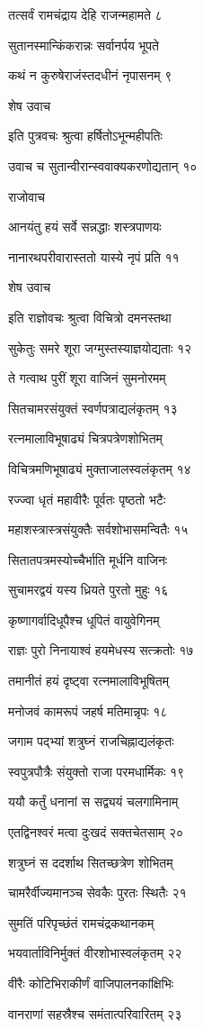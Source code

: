 तत्सर्वं रामचंद्राय देहि राजन्महामते ८

सुतानस्मान्किंकरान्नः सर्वानर्पय भूपते

कथं न कुरुषेराजंस्तदधीनं नृपासनम् ९

शेष उवाच

इति पुत्रवचः श्रुत्वा हर्षितोऽभून्महीपतिः

उवाच च सुतान्वीरान्स्ववाक्यकरणोद्यतान् १०

राजोवाच

आनयंतु हयं सर्वे सन्नद्धाः शस्त्रपाणयः

नानारथपरीवारास्ततो यास्ये नृपं प्रति ११

शेष उवाच

इति राज्ञोवचः श्रुत्वा विचित्रो दमनस्तथा

सुकेतुः समरे शूरा जग्मुस्तस्याज्ञयोद्यताः १२

ते गत्वाथ पुरीं शूरा वाजिनं सुमनोरमम्

सितचामरसंयुक्तं स्वर्णपत्राद्यलंकृतम् १३

रत्नमालाविभूषाढ्यं चित्रपत्रेणशोभितम्

विचित्रमणिभूषाढ्यं मुक्ताजालस्वलंकृतम् १४

रज्ज्वा धृतं महावीरैः पूर्वतः पृष्ठतो भटैः

महाशस्त्रास्त्रसंयुक्तैः सर्वशोभासमन्वितैः १५

सितातपत्रमस्योच्चैर्भाति मूर्धनि वाजिनः

सुचामरद्वयं यस्य ध्रियते पुरतो मुहुः १६

कृष्णागर्वादिधूपैश्च धूपितं वायुवेगिनम्

राज्ञः पुरो निनायाश्वं हयमेधस्य सत्क्रतोः १७

तमानीतं हयं दृष्ट्वा रत्नमालाविभूषितम्

मनोजवं कामरूपं जहर्ष मतिमान्नृपः १८

जगाम पद्भ्यां शत्रुघ्नं राजचिह्नाद्यलंकृतः

स्वपुत्रपौत्रैः संयुक्तो राजा परमधार्मिकः १९

ययौ कर्तुं धनानां स सद्व्ययं चलगामिनाम्

एतद्विनश्वरं मत्वा दुःखदं सक्तचेतसाम् २०

शत्रुघ्नं स ददर्शाथ सितच्छत्रेण शोभितम्

चामरैर्वीज्यमानञ्च सेवकैः पुरतः स्थितैः २१

सुमतिं परिपृच्छंतं रामचंद्रकथानकम्

भयवार्ताविनिर्मुक्तं वीरशोभास्वलंकृतम् २२

वीरैः कोटिभिराकीर्णं वाजिपालनकांक्षिभिः

वानराणां सहस्रैश्च समंतात्परिवारितम् २३

